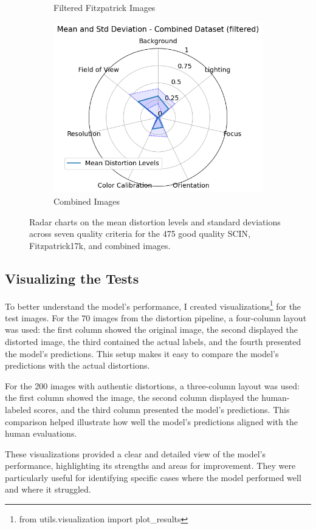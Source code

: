 \begin{figure}[ht]
\begin{subfigure}[b]{0.32\textwidth}
        \caption{Filtered Fitzpatrick Images}
        \label{fig:f17k_hept}
    \end{subfigure}
    \hfill
    \begin{subfigure}[b]{0.32\textwidth}
        \includegraphics[width=\textwidth]{img/COMB_hept.png}
        \caption{Combined Images}
        \label{fig:comb_hept}
    \end{subfigure}
    \caption{Radar charts on the mean distortion levels and standard deviations across seven quality criteria for the 475 good quality SCIN, Fitzpatrick17k, and combined images.}
    \label{fig:hept}
\end{figure}
\subsection{Visualizing the Tests}
\label{sub:VizModelPerformance}
To better understand the model’s performance, I created visualizations\footnote{from utils.visualization import plot\_results} for the test images. For the 70 images from the distortion pipeline, a four-column layout was used: the first column showed the original image, the second displayed the distorted image, the third contained the actual labels, and the fourth presented the model’s predictions. This setup makes it easy to compare the model’s predictions with the actual distortions. \par
\vspace{\baselineskip}
\noindent
For the 200 images with authentic distortions, a three-column layout was used: the first column showed the image, the second column displayed the human-labeled scores, and the third column presented the model’s predictions. This comparison helped illustrate how well the model’s predictions aligned with the human evaluations. \par
\vspace{\baselineskip}
\noindent
These visualizations provided a clear and detailed view of the model’s performance, highlighting its strengths and areas for improvement. They were particularly useful for identifying specific cases where the model performed well and where it struggled. \par